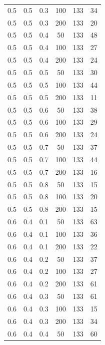 \documentclass[a4paper,14pt, unknownkeysallowed]{extreport}
\begin{document}
\begin{center}
\begin{longtable}[c]{|c|c|c|c|c|c|}
         0.5 &  0.5 &  0.3 &  100 &   133 &    34 \\
         0.5 &  0.5 &  0.3 &  200 &   133 &    20 \\
        \hline
         0.5 &  0.5 &  0.4 &   50 &   133 &    48 \\
         0.5 &  0.5 &  0.4 &  100 &   133 &    27 \\
         0.5 &  0.5 &  0.4 &  200 &   133 &    24 \\
        \hline
         0.5 &  0.5 &  0.5 &   50 &   133 &    30 \\
         0.5 &  0.5 &  0.5 &  100 &   133 &    44 \\
         0.5 &  0.5 &  0.5 &  200 &   133 &    11 \\
        \hline
         0.5 &  0.5 &  0.6 &   50 &   133 &    38 \\
         0.5 &  0.5 &  0.6 &  100 &   133 &    29 \\
         0.5 &  0.5 &  0.6 &  200 &   133 &    24 \\
        \hline
         0.5 &  0.5 &  0.7 &   50 &   133 &    37 \\
         0.5 &  0.5 &  0.7 &  100 &   133 &    44 \\
         0.5 &  0.5 &  0.7 &  200 &   133 &    16 \\
        \hline
         0.5 &  0.5 &  0.8 &   50 &   133 &    15 \\
         0.5 &  0.5 &  0.8 &  100 &   133 &    20 \\
         0.5 &  0.5 &  0.8 &  200 &   133 &    15 \\
        \hline
         0.6 &  0.4 &  0.1 &   50 &   133 &    63 \\
         0.6 &  0.4 &  0.1 &  100 &   133 &    36 \\
         0.6 &  0.4 &  0.1 &  200 &   133 &    22 \\
        \hline
         0.6 &  0.4 &  0.2 &   50 &   133 &    37 \\
         0.6 &  0.4 &  0.2 &  100 &   133 &    27 \\
         0.6 &  0.4 &  0.2 &  200 &   133 &    61 \\
        \hline
         0.6 &  0.4 &  0.3 &   50 &   133 &    61 \\
         0.6 &  0.4 &  0.3 &  100 &   133 &    15 \\
         0.6 &  0.4 &  0.3 &  200 &   133 &    34 \\
        \hline
         0.6 &  0.4 &  0.4 &   50 &   133 &    60 \\

\end{longtable}
\end{center}
\end{document}
